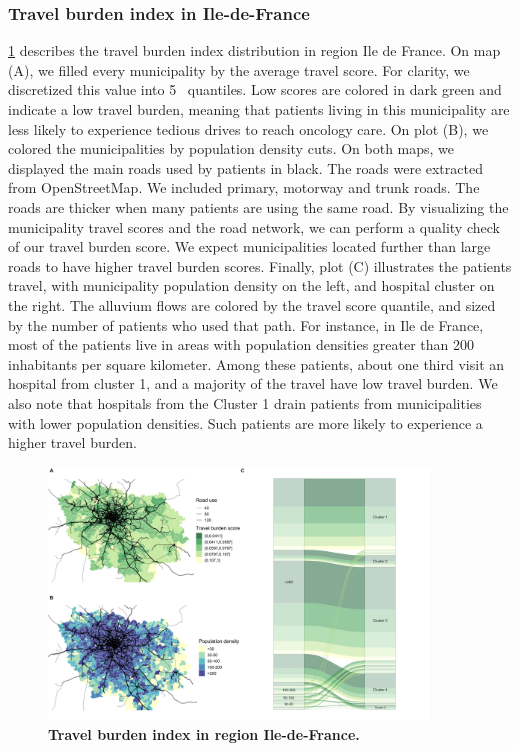 \subsubsection{Travel burden index in Ile-de-France}

\cref{fig:routes-burden-index-idf} describes the travel burden index
distribution in region Ile de France. On map (A), we filled every municipality
by the average travel score. For clarity, we discretized this value into 5 \
quantiles. Low scores are colored in dark green and indicate a low travel
burden, meaning that patients living in this municipality are less likely to
experience tedious drives to reach oncology care. On plot (B), we colored the
municipalities by population density cuts. On both maps, we displayed the main
roads used by patients in black. The roads were extracted from OpenStreetMap. We
included primary, motorway and trunk roads. The roads are thicker when many
patients are using the same road. By visualizing the municipality travel scores
and the road network, we can perform a quality check of our travel burden score.
We expect municipalities located further than large roads to have higher travel
burden scores. Finally, plot (C) illustrates the patients travel, with municipality
population density on the left, and hospital cluster on the right. The alluvium flows
are colored by the travel score quantile, and sized by the number of patients
who used that path. For instance, in Ile de France, most of the patients live
in areas with population densities greater than 200 inhabitants per square
kilometer. Among these patients, about one third visit an hospital from cluster 1,
and a majority of the travel have low travel burden. We also note that hospitals
from the Cluster 1 drain patients from municipalities with lower population
densities. Such patients are more likely to experience a higher travel burden.

\begin{figure}[H]
    \includegraphics[width=0.9\textwidth]{images/routes/fig4_11.png}
    \centering
    \caption{
        \textbf{Travel burden index in region Ile-de-France.}
    }
    \label{fig:routes-burden-index-idf}
\end{figure}

